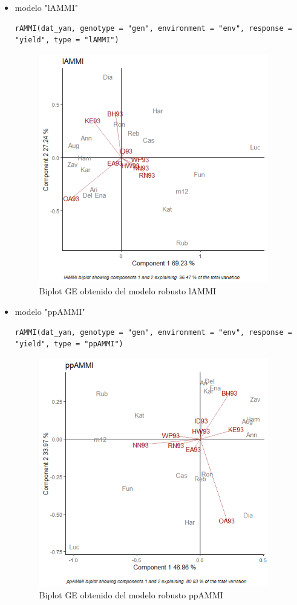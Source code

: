\begin{itemize}
\item  modelo "lAMMI"

\begin{lstlisting}
rAMMI(dat_yan, genotype = "gen", environment = "env", response = "yield", type = "lAMMI")
\end{lstlisting}


\begin{figure}[H]
	\begin{center}
		\includegraphics[width=10cm]{./Graficos/lAMMI.png}
	\end{center}
	\caption{Biplot GE obtenido del modelo robusto lAMMI}
\end{figure}


\item  modelo "ppAMMI"
\begin{lstlisting}
rAMMI(dat_yan, genotype = "gen", environment = "env", response = "yield", type = "ppAMMI")
\end{lstlisting}


\begin{figure}[H]
	\begin{center}
		\includegraphics[width=10cm]{./Graficos/ppAMMI.png}
	\end{center}
	\caption{Biplot GE obtenido del modelo robusto ppAMMI}
\end{figure}

\end{itemize}

